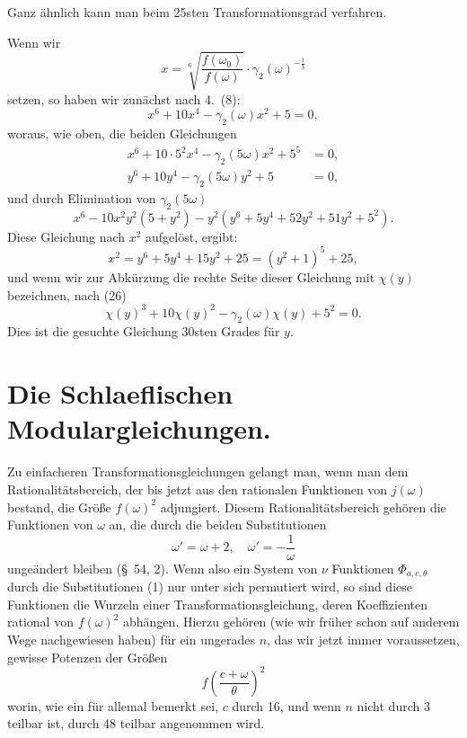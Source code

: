 \documentclass[12pt,a4paper]{article}
\theoremstyle{definition}
\begin{document}
Ganz ähnlich kann man beim 25sten Transformationsgrad verfahren.

Wenn wir
\[
x = \sqrt[6]{\frac{f(\omega_0)}{f(\omega)}} \cdot \gamma_2(\omega)^{-\frac{1}{3}}
\]
setzen, so haben wir zunächst nach 4.\ (8):
\begin{equation}\label{eq:72-26}
x^6 + 10x^4 - \gamma_2(\omega) x^2 + 5 = 0,
\end{equation}
woraus, wie oben, die beiden Gleichungen
\[
\begin{aligned}
x^6 + 10 \cdot 5^2 x^4 - \gamma_2(5\omega) x^2 + 5^5 &= 0, \\
y^6 + 10y^4 - \gamma_2(5\omega) y^2 + 5 &= 0,
\end{aligned}
\]
und durch Elimination von $\gamma_2(5\omega)$
\[
x^6 - 10x^2y^2(5 + y^2) - y^2(y^6 + 5y^4 + 52y^2 + 51y^2 + 5^2).
\]
Diese Gleichung nach $x^2$ aufgelöst, ergibt:
\begin{equation}\label{eq:72-27}
x^2 = y^6 + 5y^4 + 15y^2 + 25 = (y^2 + 1)^5 + 25,
\end{equation}
und wenn wir zur Abkürzung die rechte Seite dieser Gleichung mit $\chi(y)$ bezeichnen, nach (26)
\begin{equation}\label{eq:72-28}
\chi(y)^3 + 10\chi(y)^2 - \gamma_2(\omega) \chi(y) + 5^2 = 0.
\end{equation}
Dies ist die gesuchte Gleichung 30sten Grades für $y$.


\section{Die Schlaeflischen Modulargleichungen.}\label{sec:73}

Zu einfacheren Transformationsgleichungen gelangt man, wenn man dem Rationalitätsbereich, der bis jetzt aus den rationalen Funktionen von $j(\omega)$ bestand, die Größe $f(\omega)^2$ adjungiert. Diesem Rationalitätsbereich gehören die Funktionen von $\omega$ an, die durch die beiden Substitutionen
\begin{equation}\label{eq:73-1}
\omega' = \omega + 2, \quad \omega' = -\frac{1}{\omega}
\end{equation}
ungeändert bleiben (\S\ 54, 2). Wenn also ein System von $\nu$ Funktionen $\Phi_{a,c,\theta}$ durch die Substitutionen (1) nur unter sich permutiert wird, so sind diese Funktionen die Wurzeln einer Transformationsgleichung, deren Koeffizienten rational von $f(\omega)^2$ abhängen. Hierzu gehören (wie wir früher schon auf anderem Wege nachgewiesen haben) für ein ungerades $n$, das wir jetzt immer voraussetzen, gewisse Potenzen der Größen
\[
f\left(\frac{c + \omega}{\theta}\right)^2
\]
worin, wie ein für allemal bemerkt sei, $c$ durch 16, und wenn $n$ nicht durch 3 teilbar ist, durch 48 teilbar angenommen wird.
\end{document}
